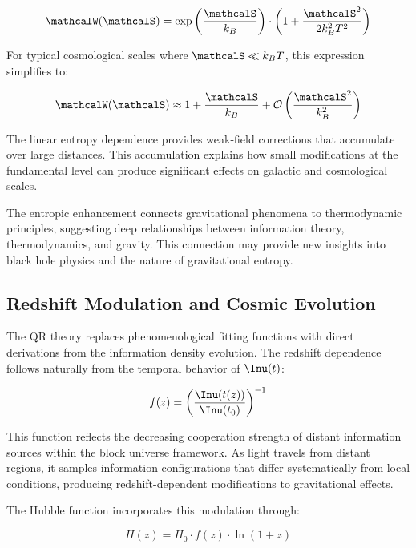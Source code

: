 \begin{equation}
\mathcalW(\mathcalS) = \exp\left(\frac{\mathcalS}{k_B}\right) \cdot \left(1 + \frac{\mathcalS^2}{2k_B^2 T^2}\right)
\label{eq:entropic-operator}
\end{equation}

For typical cosmological scales where $\mathcalS \ll k_B T$, this expression simplifies to:

\begin{equation}
\mathcalW(\mathcalS) \approx 1 + \frac{\mathcalS}{k_B} + \mathcal{O}\left(\frac{\mathcalS^2}{k_B^2}\right)
\label{eq:entropic-approximation}
\end{equation}

The linear entropy dependence provides weak-field corrections that accumulate over large distances. This accumulation explains how small modifications at the fundamental level can produce significant effects on galactic and cosmological scales.

The entropic enhancement connects gravitational phenomena to thermodynamic principles, suggesting deep relationships between information theory, thermodynamics, and gravity. This connection may provide new insights into black hole physics and the nature of gravitational entropy.

\subsection{Redshift Modulation and Cosmic Evolution}
\label{subsec:redshift-modulation}

The QR theory replaces phenomenological fitting functions with direct derivations from the information density evolution. The redshift dependence follows naturally from the temporal behavior of $\Inu(t)$:

\begin{equation}
f(z) = \left(\frac{\Inu(t(z))}{\Inu(t_0)}\right)^{-1}
\label{eq:redshift-function}
\end{equation}

This function reflects the decreasing cooperation strength of distant information sources within the block universe framework. As light travels from distant regions, it samples information configurations that differ systematically from local conditions, producing redshift-dependent modifications to gravitational effects.

The Hubble function incorporates this modulation through:

\begin{equation}
H(z) = H_0 \cdot f(z) \cdot \ln(1 + z)
\label{eq:modified-hubble}
\end{equation}

